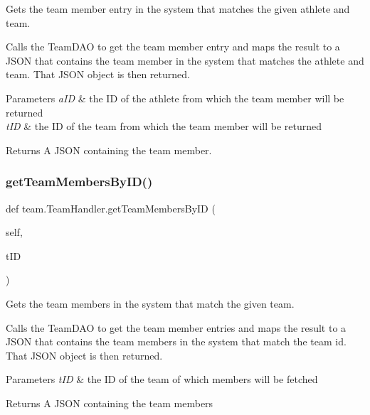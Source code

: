 Gets the team member entry in the system that matches the given athlete and team. 

Calls the Team\+D\+AO to get the team member entry and maps the result to a J\+S\+ON that contains the team member in the system that matches the athlete and team. That J\+S\+ON object is then returned.


\begin{DoxyParams}{Parameters}
{\em a\+ID} & the ID of the athlete from which the team member will be returned \\
\hline
{\em t\+ID} & the ID of the team from which the team member will be returned\\
\hline
\end{DoxyParams}
\begin{DoxyReturn}{Returns}
A J\+S\+ON containing the team member. 
\end{DoxyReturn}
\mbox{\label{classteam_1_1_team_handler_a566b7fb7abd1e6b1140146223af1c150}} 
\subsubsection{\texorpdfstring{get\+Team\+Members\+By\+I\+D()}{getTeamMembersByID()}}
{\footnotesize\ttfamily def team.\+Team\+Handler.\+get\+Team\+Members\+By\+ID (\begin{DoxyParamCaption}\item[{}]{self,  }\item[{}]{t\+ID }\end{DoxyParamCaption})}



Gets the team members in the system that match the given team. 

Calls the Team\+D\+AO to get the team member entries and maps the result to a J\+S\+ON that contains the team members in the system that match the team id. That J\+S\+ON object is then returned.


\begin{DoxyParams}{Parameters}
{\em t\+ID} & the ID of the team of which members will be fetched\\
\hline
\end{DoxyParams}
\begin{DoxyReturn}{Returns}
A J\+S\+ON containing the team members 
\end{DoxyReturn}
\mbox{\label{classteam_1_1_team_handler_a38b28e9dfb4201487c157ed15dca73f3}} 
